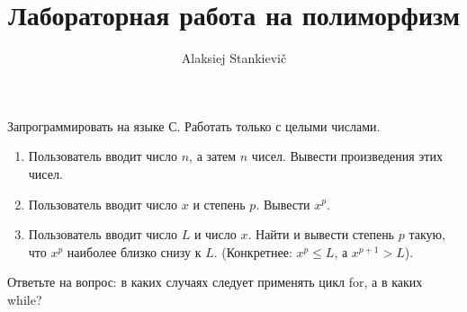 \documentclass[12pt]{article}
\author{Alaksiej Stankievič}
\title{Лабораторная работа на полиморфизм}
\begin{document}
 Запрограммировать на языке С. Работать только с целыми числами.
 \begin{enumerate}
  \item Пользователь вводит число $n$, а затем $n$ чисел. Вывести произведения этих чисел.
  \item Пользователь вводит число $x$ и степень $p$. Вывести $x^p$.
  \item Пользователь вводит число $L$ и число $x$. Найти и вывести степень $p$ такую, что 
  $x^p$ наиболее близко снизу к $L$. (Конкретнее: $x^p\leq{}L$, а $x^{p+1}>L$).
 \end{enumerate}
 
 Ответьте на вопрос: в каких случаях следует применять цикл for, а в каких while?
  
\end{document}
